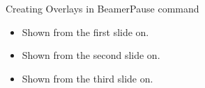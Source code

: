 
\begin{frame}{Creating Overlays in Beamer}{Pause command}

    \begin{itemize}
        \item Shown from the first slide on.
    \pause
        \item Shown from the second slide on.
    \pause
        \item Shown from the third slide on.
    \end{itemize}
    
\end{frame}
    